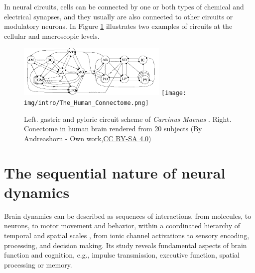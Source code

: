 In neural circuits, cells  can be connected by one or both types of chemical and electrical synapses, and they usually are also connected to other circuits or modulatory neurons. In Figure \ref{fig:neural circuits} illustrates two examples of circuits at the cellular and macroscopic levels.



\begin{figure}[hbt!]
    \centering
    \includegraphics[width=0.64\textwidth]{img/intro/cpg diagram.png}
    \texttt{[image: img/intro/The\_Human\_Connectome.png]}
    \caption{Left. gastric and pyloric circuit scheme of \textit{Carcinus Maenas} \parencite{huerta_topology_2001}. Right. Conectome in human brain rendered from 20 subjects (By Andreashorn - Own work,\href{https://commons.wikimedia.org/w/index.php?curid=41581320}{CC BY-SA 4.0})}
    \label{fig:neural circuits}
\end{figure}

\section{The sequential nature of neural dynamics}
Brain dynamics can be described as sequences of interactions, from molecules, to neurons, to motor movement and behavior, within a coordinated hierarchy of temporal and spatial scales \parencite{kiebel_hierarchy_2008,yuste05,rabinovich_discrete_2018,Rabinovich23},  from ionic channel activations to sensory encoding, processing, and decision making. Its study reveals fundamental aspects of brain function and cognition, e.g., impulse transmission, executive function, spatial processing or memory.



